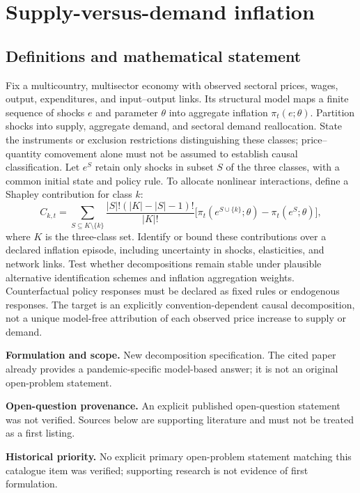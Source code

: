 \documentclass[11pt]{article}
\begin{document}
\section*{Supply-versus-demand inflation}\label{30007522}
\subsection{Definitions and mathematical statement}
Fix a multicountry, multisector economy with observed sectoral prices, wages, output, expenditures, and input–output links. Its structural model maps a finite sequence of shocks \(e\) and parameter \(\theta\) into aggregate inflation \(\pi_t(e;\theta)\). Partition shocks into supply, aggregate demand, and sectoral demand reallocation. State the instruments or exclusion restrictions distinguishing these classes; price–quantity comovement alone must not be assumed to establish causal classification. Let \(e^S\) retain only shocks in subset \(S\) of the three classes, with a common initial state and policy rule.
To allocate nonlinear interactions, define a Shapley contribution for class \(k\):
\[
C_{k,t}=\sum_{S\subseteq K\setminus\{k\}}
\frac{|S|!(|K|-|S|-1)!}{|K|!}
\big[\pi_t(e^{S\cup\{k\}};\theta)-\pi_t(e^S;\theta)\big],
\]
where \(K\) is the three-class set. Identify or bound these contributions over a declared inflation episode, including uncertainty in shocks, elasticities, and network links. Test whether decompositions remain stable under plausible alternative identification schemes and inflation aggregation weights. Counterfactual policy responses must be declared as fixed rules or endogenous responses. The target is an explicitly convention-dependent causal decomposition, not a unique model-free attribution of each observed price increase to supply or demand.

\par\textbf{Formulation and scope.} New decomposition specification. The cited paper already provides a pandemic-specific model-based answer; it is not an original open-problem statement.

\par\textbf{Open-question provenance.} An explicit published open-question statement was not verified. Sources below are supporting literature and must not be treated as a first listing.

\par\textbf{Historical priority.} No explicit primary open-problem statement matching this catalogue item was verified; supporting research is not evidence of first formulation.
\end{document}
